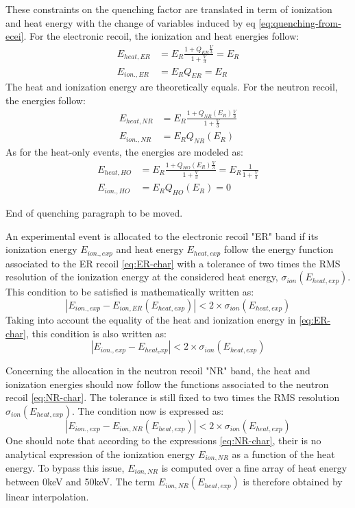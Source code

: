 These constraints on the quenching factor are translated in term of ionization and heat energy with the change of variables induced by eq \ref{eq:quenching-from-ecei}. For the electronic recoil, the ionization and heat energies follow:
\begin{align}
\label{eq:ER-char}
	E_{heat, ER} &= E_R \frac{1 + Q_{ER}\frac{V}{3}}{1 + \frac{V}{3}} = E_R \\
	E_{ion., ER} &= E_R Q_{ER} = E_R
\end{align}
The heat and ionization energy are theoretically equals.
For the neutron recoil, the energies follow:
\begin{align}
\label{eq:NR-char}
	E_{heat, NR} &= E_R \frac{1 + Q_{NR}(E_R)\frac{V}{3}}{1 + \frac{V}{3}} \\
	E_{ion., NR} &= E_R Q_{NR}(E_R)
\end{align}
As for the heat-only events, the energies are modeled as:
\begin{align}
\label{eq:HO-char}
	E_{heat, HO} &= E_R \frac{1 + Q_{HO}(E_R)\frac{V}{3}}{1 + \frac{V}{3}} = E_R \frac{1}{1 + \frac{V}{3}} \\
	E_{ion., HO} &= E_R Q_{HO}(E_R) = 0
\end{align}

{\color{red} End of quenching paragraph to be moved.}


An experimental event is allocated to the electronic recoil "ER" band if its ionization energy $E_{ion., exp}$ and heat energy $E_{heat, exp}$ follow the energy function associated to the ER recoil \ref{eq:ER-char} with a tolerance of two times the RMS resolution of the ionization energy at the considered heat energy, $\sigma_{ion}(E_{heat, exp})$. This condition to be satisfied is mathematically written as:
\begin{equation}
|E_{ion., exp} - E_{ion, ER}(E_{heat, exp})| < 2 \times \sigma_{ion}\left( E_{heat, exp}\right)
\end{equation}
Taking into account the equality of the heat and ionization energy in \ref{eq:ER-char}, this condition is also written as:
\begin{equation}
\label{eq:condition-ER-ecei}
|E_{ion., exp} - E_{heat_exp}| < 2 \times \sigma_{ion}\left( E_{heat, exp}\right)
\end{equation}

Concerning the allocation in the neutron recoil "NR" band, the heat and ionization energies should now follow the functions associated to the neutron recoil \ref{eq:NR-char}. The tolerance is still fixed to two times the RMS resolution $\sigma_{ion}(E_{heat, exp})$. The condition now is expressed as:
\begin{equation}
\label{eq:condition-NR-ecei}
|E_{ion., exp} - E_{ion, NR}(E_{heat, exp})| < 2 \times \sigma_{ion}\left( E_{heat, exp}\right)
\end{equation}
One should note that according to the expressions \ref{eq:NR-char}, their is no analytical expression of the ionization energy $E_{ion, NR}$ as a function of the heat energy. To bypass this issue, $E_{ion, NR}$ is computed over a fine array of heat energy between 0keV and 50keV. The term $E_{ion, NR}(E_{heat, exp})$ is therefore obtained by linear interpolation.

